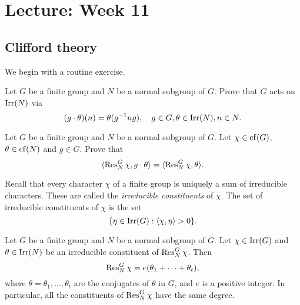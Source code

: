 \section{Lecture: Week 11}

\subsection{Clifford theory}

We begin with a routine exercise. 


\begin{exercise}
\label{xca:conjugate_chars1}
Let $G$ be a finite group and $N$ be a normal subgroup
of $G$. Prove that $G$ acts on $\operatorname{Irr}(N)$ via 
\[
(g\cdot\theta)(n)=\theta(g^{-1}ng),\quad 
g\in G,\theta\in\operatorname{Irr}(N),n\in N.
\]
\end{exercise}

\begin{exercise}
\label{xca:conjugate_chars2}
Let $G$ be a finite group and $N$ be a normal subgroup of $G$. 
Let $\chi\in\operatorname{cf}(G)$, $\theta\in\operatorname{cf}(N)$ and $g\in G$. Prove that
\[
\langle\operatorname{Res}_N^G\chi,g\cdot\theta\rangle=\langle\operatorname{Res}_N^G\chi,\theta\rangle.
\]
\end{exercise}

Recall that every character $\chi$ of a finite group is uniquely 
a sum of irreducible characters. These are called
the \emph{irreducible constituents} of $\chi$. The set 
of irreducible constituents of $\chi$ is the set  
\[
\{\eta\in\operatorname{Irr}(G):\langle\chi,\eta\rangle>0\}.
\]

\begin{theorem}[Clifford]
\label{thm:Clifford}
    Let $G$ be a finite group and $N$ be a normal
    subgroup of $G$. Let $\chi\in\operatorname{Irr}(G)$ and $\theta\in\operatorname{Irr}(N)$ be 
    an irreducible constituent of $\operatorname{Res}_N^G\chi$. 
    Then 
    \[
    \operatorname{Res}_N^G\chi = e(\theta_1+\cdots+\theta_t),
    \]
    where $\theta=\theta_1,\dots,\theta_t$ are the conjugates 
    of $\theta$ in $G$, 
    and $e$ is a positive integer. In particular, all the constituents of $\operatorname{Res}_N^G\chi$ have the same degree. 
\end{theorem}

